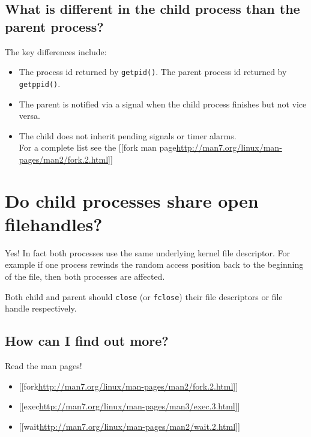 \subsection{What is different in the child process than the parent
process?}\label{what-is-different-in-the-child-process-than-the-parent-process}

The key differences include:

\begin{itemize}
\itemsep1pt\parskip0pt
\item
  The process id returned by \texttt{getpid()}. The parent process id
  returned by \texttt{getppid()}.
\item
  The parent is notified via a signal when the child process finishes
  but not vice versa.
\item
  The child does not inherit pending signals or timer alarms.\\For a
  complete list see the {[}{[}fork man
  page\textbar{}\url{http://man7.org/linux/man-pages/man2/fork.2.html}{]}{]}
\end{itemize}

\section{Do child processes share open
filehandles?}\label{do-child-processes-share-open-filehandles}

Yes! In fact both processes use the same underlying kernel file
descriptor. For example if one process rewinds the random access
position back to the beginning of the file, then both processes are
affected.

Both child and parent should \texttt{close} (or \texttt{fclose}) their
file descriptors or file handle respectively.

\subsection{How can I find out more?}\label{how-can-i-find-out-more}

Read the man pages!

\begin{itemize}
\itemsep1pt\parskip0pt
\item
  {[}{[}fork\textbar{}\url{http://man7.org/linux/man-pages/man2/fork.2.html}{]}{]}
\item
  {[}{[}exec\textbar{}\url{http://man7.org/linux/man-pages/man3/exec.3.html}{]}{]}
\item
  {[}{[}wait\textbar{}\url{http://man7.org/linux/man-pages/man2/wait.2.html}{]}{]}
\end{itemize}
